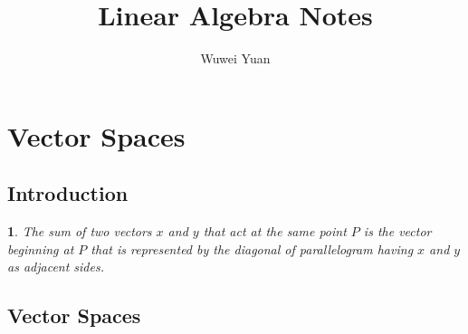 \documentclass{article}
\theoremstyle{plain}
\theoremstyle{plain} %
\newcommand{\thistheoremname}{}
\newtheorem*{genericthm}{\thistheoremname}
\newenvironment{namedtheorem}[1]
  {\renewcommand{\thistheoremname}{#1}%
   \begin{genericthm}}
  {\end{genericthm}}
\begin{document}
\title{Linear Algebra Notes}

\author{Wuwei Yuan}

\maketitle

\tableofcontents
\newpage

\section{Vector Spaces}

\subsection{Introduction}

\begin{namedtheorem}{Parallelogram Law for Vector Addition}
The sum of two vectors $x$ and $y$ that act at the same point $P$ is the vector beginning at $P$ that is
represented by the diagonal of parallelogram having $x$ and $y$ as adjacent sides.
\end{namedtheorem}

\subsection{Vector Spaces}
\end{document}
